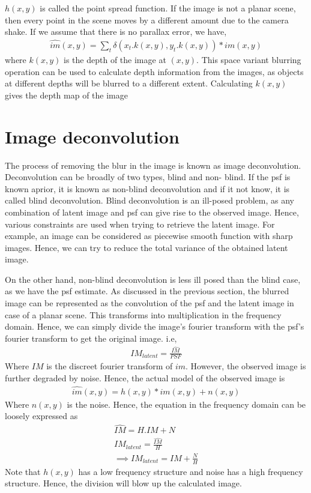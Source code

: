 \documentclass[BTech]{iitmdiss}
\begin{document}
$h(x,y)$ is called the point spread function. If the image is not a 
planar scene, then every point in the scene moves by a different amount
due to the camera shake. If we assume that there is no parallax error,
we have,
\begin{align*}
\hat{im}(x,y) = \sum_t\delta(x_t.k(x,y), y_t.k(x,y))*im(x,y)
\end{align*}
where $k(x,y)$ is the depth of the image at $(x,y)$. This space variant
blurring operation can be used to calculate depth information from the 
images, as objects at different depths will be blurred to a different
extent. Calculating $k(x,y)$ gives the depth map of the image

\section{Image deconvolution}
\label{basic_theory:deconv}
The process of removing the blur in the image is known as image
deconvolution. Deconvolution can be broadly of two types, blind and non-
blind. If the psf is known aprior, it is known as non-blind 
deconvolution and if it not know, it is called blind deconvolution. 
Blind deconvolution is an ill-posed problem, as any combination of 
latent image and psf can give rise to the observed image. Hence, various
constraints are used when trying to retrieve the latent image. For 
example, an image can be considered as piecewise smooth function with
sharp images. Hence, we can try to reduce the total variance of the 
obtained latent image. %

On the other hand, non-blind deconvolution is less ill posed than the
blind case, as we have the psf estimate. As discussed in the previous 
section, the blurred image can be represented as the convolution of 
the psf and the latent image in case of a planar scene. This 
transforms into multiplication in the frequency domain. Hence, we can
simply divide the image's fourier transform with the psf's fourier
transform to get the original image. i.e,
\begin{align*}
IM_{latent} = \frac{\hat{IM}}{PSF}
\end{align*}
Where $IM$ is the discreet fourier transform of $im$. However, the 
observed image is further degraded by noise. Hence, the actual model of
the observed image is
\begin{align*}
\hat{im}(x,y) = h(x,y)*im(x,y) + n(x,y) 
\end{align*}
Where $n(x,y)$ is the noise. Hence, the equation in the frequency domain
can be loosely expressed as
\begin{align*}
\hat{IM} = H.IM + N\\
IM_{latent} = \frac{\hat{IM}}{H}\\
\implies IM_{latent} = IM + \frac{N}{H}
\end{align*}
Note that $h(x,y)$ has a low frequency structure and noise has a high 
frequency structure. Hence, the division will blow up the calculated 
image. 
\end{document}
